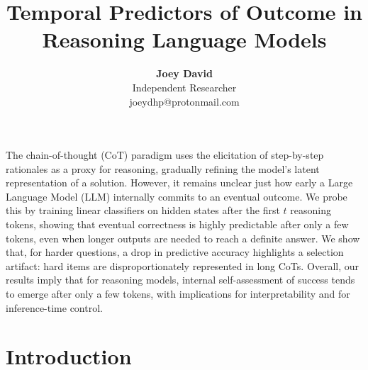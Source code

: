 \documentclass[10pt,a4paper,twocolumn]{article}
\title{Temporal Predictors of Outcome in Reasoning Language Models}
\author{
  \textbf{Joey David} \\[1pt]
  Independent Researcher \\[1pt]
  joeydhp@protonmail.com
}
\date{}
\begin{document}
\maketitle
\vspace{10mm}

\renewenvironment{abstract}{
  \begin{center}
  \begin{minipage}{0.9\columnwidth}
  \centering{\large\bfseries\abstractname}
  \par\vspace{14pt}
  \justifying
  \ignorespaces
}{
  \end{minipage}
  \end{center}
}

\begin{abstract}
The chain-of-thought (CoT) paradigm uses the elicitation of step-by-step rationales as a proxy for reasoning, gradually refining the model’s latent representation of a solution. However, it remains unclear just how early a Large Language Model (LLM) internally commits to an eventual outcome. We probe this by training linear classifiers on hidden states after the first $t$ reasoning tokens, showing that eventual correctness is highly predictable after only a few tokens, even when longer outputs are needed to reach a definite answer. We show that, for harder questions, a drop in predictive accuracy highlights a selection artifact: hard items are disproportionately represented in long CoTs. Overall, our results imply that for reasoning models, internal self-assessment of success tends to emerge after only a few tokens, with implications for interpretability and for inference-time control.
\end{abstract}

\par\vspace{10pt}

\section{Introduction}
\label{sec:intro}
\end{document}
